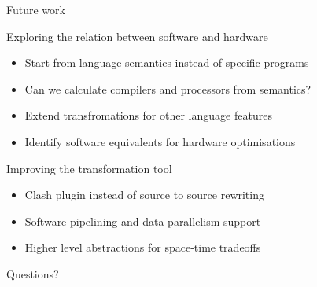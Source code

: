 \documentclass[pdf]{beamer}
\begin{document}
\begin{frame}{Future work}

\begin{block}{Exploring the relation between software and hardware}
\begin{itemize}
\item Start from language semantics instead of specific programs
\item Can we calculate compilers and processors from semantics?
\item Extend transfromations for other language features %
\item Identify software equivalents for hardware optimisations
\end{itemize}
\end{block}

\begin{block}{Improving the transformation tool}
\begin{itemize}
\item Clash plugin instead of source to source rewriting
\item Software pipelining and data parallelism support
\item Higher level abstractions for space-time tradeoffs
\end{itemize}
\end{block}

\end{frame}

\begin{frame}
\Huge{\centerline{Questions?}}
\end{frame}
\end{document}
